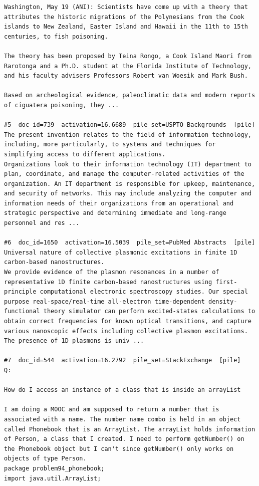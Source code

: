 \begin{verbatim}
Washington, May 19 (ANI): Scientists have come up with a theory that attributes the historic migrations of the Polynesians from the Cook islands to New Zealand, Easter Island and Hawaii in the 11th to 15th centuries, to fish poisoning.

The theory has been proposed by Teina Rongo, a Cook Island Maori from Rarotonga and a Ph.D. student at the Florida Institute of Technology, and his faculty advisers Professors Robert van Woesik and Mark Bush.

Based on archeological evidence, paleoclimatic data and modern reports of ciguatera poisoning, they ...

#5  doc_id=739  activation=16.6689  pile_set=USPTO Backgrounds  [pile]
The present invention relates to the field of information technology, including, more particularly, to systems and techniques for simplifying access to different applications.
Organizations look to their information technology (IT) department to plan, coordinate, and manage the computer-related activities of the organization. An IT department is responsible for upkeep, maintenance, and security of networks. This may include analyzing the computer and information needs of their organizations from an operational and strategic perspective and determining immediate and long-range personnel and res ...

#6  doc_id=1650  activation=16.5039  pile_set=PubMed Abstracts  [pile]
Universal nature of collective plasmonic excitations in finite 1D carbon-based nanostructures.
We provide evidence of the plasmon resonances in a number of representative 1D finite carbon-based nanostructures using first-principle computational electronic spectroscopy studies. Our special purpose real-space/real-time all-electron time-dependent density-functional theory simulator can perform excited-states calculations to obtain correct frequencies for known optical transitions, and capture various nanoscopic effects including collective plasmon excitations. The presence of 1D plasmons is univ ...

#7  doc_id=544  activation=16.2792  pile_set=StackExchange  [pile]
Q:

How do I access an instance of a class that is inside an arrayList

I am doing a MOOC and am supposed to return a number that is associated with a name. The number name combo is held in an object called Phonebook that is an ArrayList. The arrayList holds information of Person, a class that I created. I need to perform getNumber() on the Phonebook object but I can't since getNumber() only works on objects of type Person.
package problem94_phonebook;
import java.util.ArrayList;


\end{verbatim}

